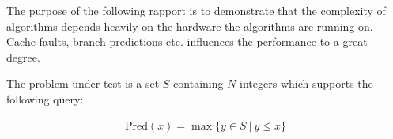 The purpose of the following rapport is to demonstrate that the complexity of algorithms depends heavily on the hardware the algorithms are running on. Cache faults, branch predictions etc. influences the performance to a great degree.

The problem under test is a set $S$ containing $N$ integers which supports the following query:

\begin{eqnarray*}
\mathrm{Pred}(x) = \max \{ y \in S\ |\ y \leq x \}
\end{eqnarray*}
